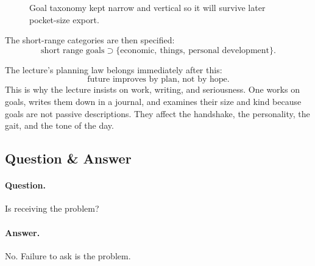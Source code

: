 \begin{figure}[h]
\centering
{}
\caption{Goal taxonomy kept narrow and vertical so it will survive later pocket-size export.}
\end{figure}

The short-range categories are then specified:
\begin{equation}
\text{short range goals} \supset \{\text{economic},\ \text{things},\ \text{personal development}\}.
\end{equation}

The lecture's planning law belongs immediately after this:
\begin{equation}
\text{future improves by plan, not by hope}.
\end{equation}
This is why the lecture insists on work, writing, and seriousness. One works on goals, writes them down in a journal, and examines their size and kind because goals are not passive descriptions. They affect the handshake, the personality, the gait, and the tone of the day.

\subsection{Question \& Answer}

\paragraph{Question.} Is receiving the problem?

\paragraph{Answer.} No. Failure to ask is the problem.

